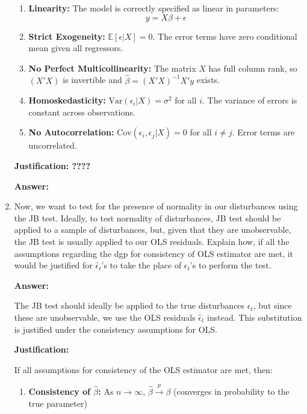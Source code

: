 \documentclass[12pt,a4paper]{article}
\begin{document}
\begin{enumerate}[label=(\alph*)]
      \begin{enumerate}
      \item \textbf{Linearity:} The model is correctly specified as linear in parameters:
      $$y = X\beta + \epsilon$$

      \item \textbf{Strict Exogeneity:} $\mathbb{E}[\epsilon | X] = 0$. The error terms have zero conditional mean given all regressors.

      \item \textbf{No Perfect Multicollinearity:} The matrix $X$ has full column rank, so $(X'X)$ is invertible and $\hat{\beta} = (X'X)^{-1}X'y$ exists.

      \item \textbf{Homoskedasticity:} $\text{Var}(\epsilon_i | X) = \sigma^2$ for all $i$. The variance of errors is constant across observations.

      \item \textbf{No Autocorrelation:} $\text{Cov}(\epsilon_i, \epsilon_j | X) = 0$ for all $i \neq j$. Error terms are uncorrelated.
      \end{enumerate}

    \textbf{Justification: ????} 
  
  \textbf{Answer:} 
  
  \item Now, we want to test for the presence of normality in our disturbances using the JB test. Ideally, to test normality of disturbances, JB test should be applied to a sample of disturbances, but, given that they are unobservable, the JB test is usually applied to our OLS residuals. Explain how, if all the assumptions regarding the dgp for consistency of OLS estimator are met, it would be justified for $\hat{\epsilon}_t$'s to take the place of $\epsilon_t$'s to perform the test.
  
  \textbf{Answer:}

The JB test should ideally be applied to the true disturbances $\epsilon_t$, but since these are unobservable, we use the OLS residuals $\hat{\epsilon}_t$ instead. This substitution is justified under the consistency assumptions for OLS.

\textbf{Justification:}

If all assumptions for consistency of the OLS estimator are met, then:

\begin{enumerate}
\item \textbf{Consistency of $\hat{\beta}$:} As $n \to \infty$, $\hat{\beta} \xrightarrow{p} \beta$ (converges in probability to the true parameter)


\end{enumerate}
\end{enumerate}
\end{document}
